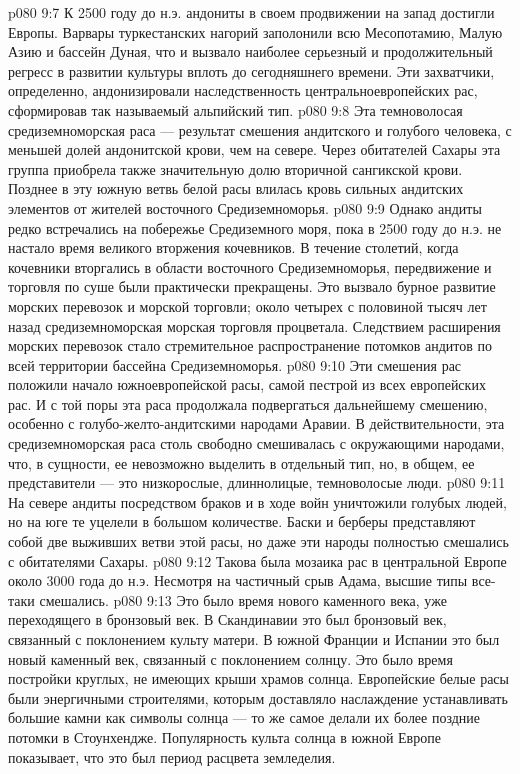 \vs p080 9:7 К 2500 году до н.э. андониты в своем продвижении на запад достигли Европы. Варвары туркестанских нагорий заполонили всю Месопотамию, Малую Азию и бассейн Дуная, что и вызвало наиболее серьезный и продолжительный регресс в развитии культуры вплоть до сегодняшнего времени. Эти захватчики, определенно, андонизировали наследственность центральноевропейских рас, сформировав так называемый альпийский тип.
\vs p080 9:8 \bibnobreakspace {} Эта темноволосая средиземноморская раса --- результат смешения андитского и голубого человека, с меньшей долей андонитской крови, чем на севере. Через обитателей Сахары эта группа приобрела также значительную долю вторичной сангикской крови. Позднее в эту южную ветвь белой расы влилась кровь сильных андитских элементов от жителей восточного Средиземноморья.
\vs p080 9:9 Однако андиты редко встречались на побережье Средиземного моря, пока в 2500 году до н.э. не настало время великого вторжения кочевников. В течение столетий, когда кочевники вторгались в области восточного Средиземноморья, передвижение и торговля по суше были практически прекращены. Это вызвало бурное развитие морских перевозок и морской торговли; около четырех с половиной тысяч лет назад средиземноморская морская торговля процветала. Следствием расширения морских перевозок стало стремительное распространение потомков андитов по всей территории бассейна Средиземноморья.
\vs p080 9:10 Эти смешения рас положили начало южноевропейской расы, самой пестрой из всех европейских рас. И с той поры эта раса продолжала подвергаться дальнейшему смешению, особенно с голубо\hyp{}желто\hyp{}андитскими народами Аравии. В действительности, эта средиземноморская раса столь свободно смешивалась с окружающими народами, что, в сущности, ее невозможно выделить в отдельный тип, но, в общем, ее представители --- это низкорослые, длиннолицые, темноволосые люди.
\vs p080 9:11 На севере андиты посредством браков и в ходе войн уничтожили голубых людей, но на юге те уцелели в большом количестве. Баски и берберы представляют собой две выживших ветви этой расы, но даже эти народы полностью смешались с обитателями Сахары.
\vs p080 9:12 \pc Такова была мозаика рас в центральной Европе около 3000 года до н.э. Несмотря на частичный срыв Адама, высшие типы все\hyp{}таки смешались.
\vs p080 9:13 \pc Это было время нового каменного века, уже переходящего в бронзовый век. В Скандинавии это был бронзовый век, связанный с поклонением культу матери. В южной Франции и Испании это был новый каменный век, связанный с поклонением солнцу. Это было время постройки круглых, не имеющих крыши храмов солнца. Европейские белые расы были энергичными строителями, которым доставляло наслаждение устанавливать большие камни как символы солнца --- то же самое делали их более поздние потомки в Стоунхендже. Популярность культа солнца в южной Европе показывает, что это был период расцвета земледелия.
